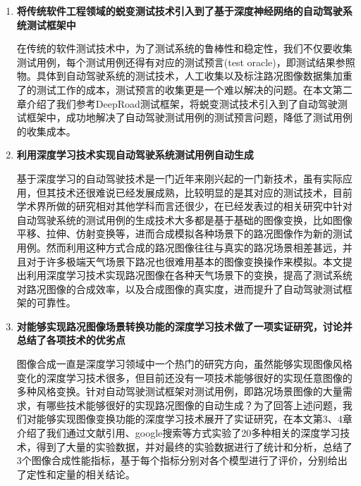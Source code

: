 \begin{enumerate}[itemindent=20pt, listparindent = 0.7cm]
    \item \textbf{将传统软件工程领域的蜕变测试技术引入到了基于深度神经网络的自动驾驶系统测试框架中}
    
    在传统的软件测试技术中，为了测试系统的鲁棒性和稳定性，我们不仅要收集测试用例，每个测试用例还得有对应的测试预言(test oracle)，即测试结果参照物。具体到自动驾驶系统的测试技术，人工收集以及标注路况图像数据集加重了的测试工作的成本，测试预言的收集更是一个难以解决的问题。在本文第二章介绍了我们参考DeepRoad测试框架，将蜕变测试技术引入到了自动驾驶测试框架中，成功地解决了自动驾驶测试用例的测试预言问题，降低了测试用例的收集成本。

    \item \textbf{利用深度学习技术实现自动驾驶系统测试用例自动生成}
    
    基于深度学习的自动驾驶技术是一门近年来刚兴起的一门新技术，虽有实际应用，但其技术还很难说已经发展成熟，比较明显的是其对应的测试技术，目前学术界所做的研究相对其他学科而言还很少，在已经发表过的相关研究中针对自动驾驶系统的测试用例的生成技术大多都是基于基础的图像变换，比如图像平移、拉伸、仿射变换等，进而合成模拟各种场景下的路况图像作为新的测试用例。然而利用这种方式合成的路况图像往往与真实的路况场景相差甚远，并且对于许多极端天气场景下路况也很难用基本的图像变换操作来模拟。本文提出利用深度学习技术实现路况图像在各种天气场景下的变换，提高了测试系统对路况图像的合成效率，以及合成图像的真实度，进而提升了自动驾驶测试框架的可靠性。
    
    \item \textbf{对能够实现路况图像场景转换功能的深度学习技术做了一项实证研究，讨论并总结了各项技术的优劣点}
    
    图像合成一直是深度学习领域中一个热门的研究方向，虽然能够实现图像风格变化的深度学习技术很多，但目前还没有一项技术能够很好的实现任意图像的多种风格变换。针对自动驾驶测试框架对测试用例，即路况场景图像的大量需求，有哪些技术能够很好的实现路况图像的自动生成？为了回答上述问题，我们对能够实现图像变换功能的深度学习技术展开了实证研究，在本文第3、4章介绍了我们通过文献引用、google搜索等方式实验了20多种相关的深度学习技术，得到了大量的实验数据，并对最终的实验数据进行了统计和分析，总结了3个图像合成性能指标，基于每个指标分别对各个模型进行了评价，分别给出了定性和定量的相关结论。

\end{enumerate}
